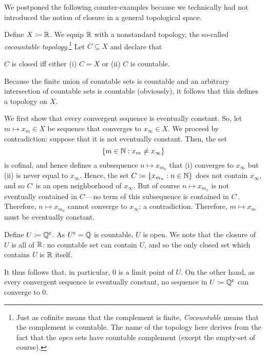 We postponed the following counter-examples because we technically had not introduced the notion of closure in a general topological space.
\begin{exm}\label{exm4.2.8x}
Define $X\coloneqq \mathbb{R}$.  We equip $\mathbb{R}$ with a nonstandard topology, the so-called \emph{cocountable topology}.\footnote{Just as cofinite means that the complement is finite, \emph{Cocountable} means that the complement is countable.  The name of the topology here derives from the fact that the \emph{open} sets have countable complement (except the empty-set of course).}  Let $C\subseteq X$ and declare that
\begin{textequation}
$C$ is closed iff either (i) $C=X$ or (ii) $C$ is countable.
\end{textequation}
Because the finite union of countable sets is countable and an arbitrary intersection of countable sets is countable (obviously), it follows that this defines a topology on $X$.

We first show that every convergent sequence is eventually constant.  So, let $m\mapsto x_m\in X$ be sequence that converges to $x_\infty \in X$.  We proceed by contradiction:  suppose that it is not eventually constant.  Then, the set
\begin{equation}
\{ m\in \mathbb{N} :x_m\neq x_\infty \}
\end{equation}
is cofinal, and hence defines a subsequence $n\mapsto x_{m_n}$ that (i) converges to $x_\infty$ but (ii) is never equal to $x_\infty$.  Hence, the set $C\coloneq \{ x_{m_n}:n\in \mathbb{N} \}$ does not contain $x_\infty$, and so $C^{\comp}$ is an open neighborhood of $x_\infty$.  But of course $n\mapsto x_{m_n}$ is not eventually contained in $C^{\comp}$---no term of this subsequence is contained in $C^{\comp}$.  Therefore, $n\mapsto x_{m_n}$ cannot converge to $x_\infty$:  a contradiction.  Therefore, $m\mapsto x_m$ must be eventually constant.

Define $U\coloneqq \mathbb{Q} ^{\mathsf{c}}$.  As $U^{\mathsf{c}}=\mathbb{Q}$ is countable, $U$ is open.  We note that the closure of $U$ is all of $\mathbb{R}$:  no countable set can contain $U$, and so the only closed set which contains $U$ is $\mathbb{R}$ itself.

It thus follows that, in particular, $0$ is a limit point of $U$.  On the other hand, as every convergent sequence is eventually constant, no sequence in $U\coloneqq \mathbb{Q} ^{\mathsf{c}}$ can converge to $0$.
\end{exm}

